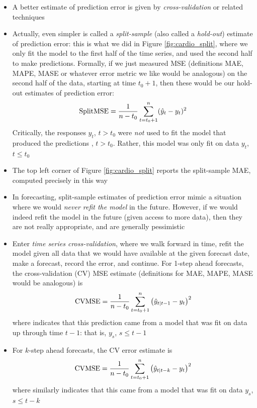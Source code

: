 \documentclass{article}
\begin{document}
\begin{itemize}
\item A better estimate of prediction error is given by \emph{cross-validation}
  or related techniques

\item Actually, even simpler is called a \emph{split-sample} (also called a
  \emph{hold-out}) estimate of prediction error: this is what we did in Figure
  \ref{fig:cardio_split}, where we only fit the model to the first half of the
  time series, and used the second half to make predictions. Formally, if we
  just measured MSE (definitions MAE, MAPE, MASE or whatever error metric we
  like would be analogous) on the second half of the data, starting at time
  $t_0+1$, then these would be our hold-out estimates of prediction error: 
  \[
  \mathrm{SplitMSE} = \frac{1}{n-t_0} \sum_{t = t_0+1}^n (\hat{y}_t - y_t)^2 
  \]
  Critically, the responses $y_t$, $t > t_0$ were \emph{not} used to fit the
  model that produced the predictions , $t > t_0$. Rather,
  this model was only fit on data $y_t$, $t \leq t_0$

\item The top left corner of Figure \ref{fig:cardio_split} reports the
  split-sample MAE, computed precisely in this way 

\item In forecasting, split-sample estimates of prediction error mimic a
  situation where we would \emph{never refit the model} in the future. However,
  if we would indeed refit the model in the future (given access to more data),
  then they are not really appropriate, and are generally pessimistic

\item Enter \emph{time series cross-validation}, where we walk forward in time,
  refit the model given all data that we would have available at the given
  forecast date, make a forecast, record the error, and continue. For 1-step
  ahead forecasts, the cross-validation (CV) MSE estimate (definitions for MAE,
  MAPE, MASE would be analogous) is
  \[
  \mathrm{CVMSE} = \frac{1}{n-t_0} \sum_{t = t_0+1}^n \big( \hat{y}_{t | t-1} - y_t
  \big)^2     
  \]
  where  indicates that this prediction came from a
  model that was fit on data up through time $t-1$: that is, $y_s$, $s \leq t-1$ 

\item For $k$-step ahead forecasts, the CV error estimate is
  \[
  \mathrm{CVMSE} = \frac{1}{n-t_0} \sum_{t = t_0+1}^n \big( \hat{y}_{t | t-k} - y_t
  \big)^2     
  \]
  where similarly  indicates that this came from a
  model that was fit on data $y_s$, $s \leq t-k$  


\end{itemize}
\end{document}
